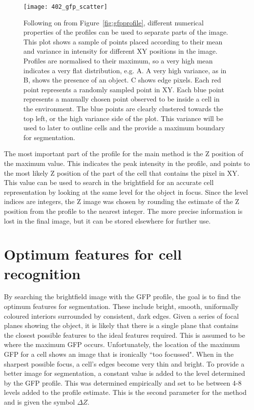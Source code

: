 \begin{figure}[h!]
 \centering
 \texttt{[image: 402\_gfp\_scatter]}
 \caption[GFP scatter plot]{
 	Following on from Figure~\ref{fig:gfpprofile}, different numerical properties of the profiles can be used to separate parts of the image. This plot shows a sample of points placed according to their mean and variance in intensity for different XY positions in the image. Profiles are normalised to their maximum, so a very high mean indicates a very flat distribution, e.g. A. A very high variance, as in B, shows the presence of an object. C shows edge pixels. Each red point represents a randomly sampled point in XY. Each blue point represents a manually chosen point observed to be inside a cell in the environment. The blue points are clearly clustered towards the top left, or the high variance side of the plot. This variance will be used to later to outline cells and the provide a maximum boundary for segmentation.
 }
 \label{fig:gfpscatter}
\end{figure}

The most important part of the profile for the main method is the Z position of the maximum value. This indicates the peak intensity in the profile, and points to the most likely Z position of the part of the cell that contains the pixel in XY. This value can be used to search in the brightfield for an accurate cell representation by looking at the same level for the object in focus. Since the level indices are integers, the Z image was chosen by rounding the estimate of the Z position from the profile to the nearest integer. The more precise information is lost in the final image, but it can be stored elsewhere for further use.

\section{Optimum features for cell recognition}

By searching the brightfield image with the GFP profile, the goal is to find the optimum features for segmentation. These include bright, smooth, uniformally coloured interiors surrounded by consistent, dark edges. Given a series of focal planes showing the object, it is likely that there is a single plane that contains the closest possible features to the ideal features required. This is assumed to be where the maximum GFP occurs. Unfortunately, the location of the maximum GFP for a cell shows an image that is ironically ``too focussed". When in the sharpest possible focus, a cell's edges become very thin and bright. To provide a better image for segmentation, a constant value is added to the level determined by the GFP profile. This was determined empirically and set to be between 4-8 levels added to the profile estimate. This is the second parameter for the method and is given the symbol $\Delta Z$.

